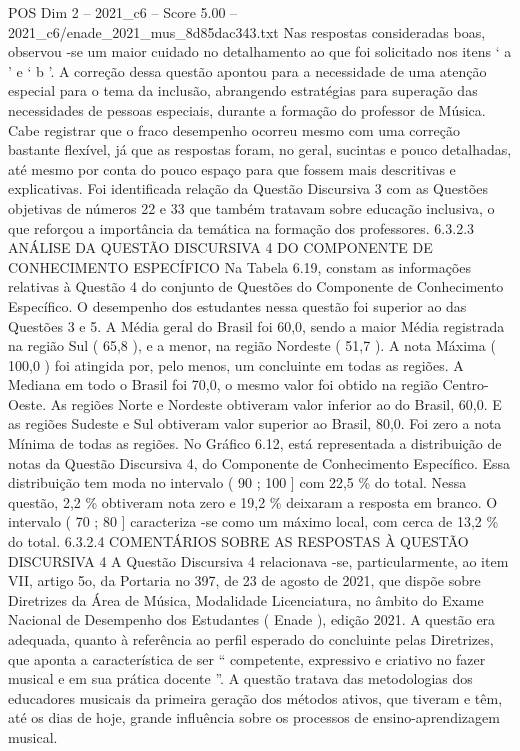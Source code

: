 \begin{textsample}{POS Dim 2 – 2021\_c6 – Score 5.00 – 2021\_c6/enade\_2021\_mus\_8d85dac343.txt}
Nas respostas consideradas boas, observou -se um maior cuidado no detalhamento ao que foi solicitado nos itens ‘ a ’ e ‘ b ’.
A correção dessa questão apontou para a necessidade de uma atenção especial para o tema da inclusão, abrangendo estratégias para superação das necessidades de pessoas especiais, durante a formação do professor de Música.
Cabe registrar que o fraco desempenho ocorreu mesmo com uma correção bastante flexível, já que as respostas foram, no geral, sucintas e pouco detalhadas, até mesmo por conta do pouco espaço para que fossem mais descritivas e explicativas.
Foi identificada relação da Questão Discursiva 3 com as Questões objetivas de números 22 e 33 que também tratavam sobre educação inclusiva, o que reforçou a importância da temática na formação dos professores. 6.3.2.3 ANÁLISE DA QUESTÃO DISCURSIVA 4 DO COMPONENTE DE CONHECIMENTO ESPECÍFICO Na Tabela 6.19, constam as informações relativas à Questão 4 do conjunto de Questões do Componente de Conhecimento Específico.
O desempenho dos estudantes nessa questão foi superior ao das Questões 3 e 5.
A Média geral do Brasil foi 60,0, sendo a maior Média registrada na região Sul ( 65,8 ), e a menor, na região Nordeste ( 51,7 ).
A nota Máxima ( 100,0 ) foi atingida por, pelo menos, um concluinte em todas as regiões.
A Mediana em todo o Brasil foi 70,0, o mesmo valor foi obtido na região Centro-Oeste.
As regiões Norte e Nordeste obtiveram valor inferior ao do Brasil, 60,0.
E as regiões Sudeste e Sul obtiveram valor superior ao Brasil, 80,0.
Foi zero a nota Mínima de todas as regiões.
No Gráfico 6.12, está representada a distribuição de notas da Questão Discursiva 4, do Componente de Conhecimento Específico.
Essa distribuição tem moda no intervalo ( 90 ; 100 ] com 22,5 \% do total.
Nessa questão, 2,2 \% obtiveram nota zero e 19,2 \% deixaram a resposta em branco.
O intervalo ( 70 ; 80 ] caracteriza -se como um máximo local, com cerca de 13,2 \% do total. 6.3.2.4 COMENTÁRIOS SOBRE AS RESPOSTAS À QUESTÃO DISCURSIVA 4 A Questão Discursiva 4 relacionava -se, particularmente, ao item VII, artigo 5o, da Portaria no 397, de 23 de agosto de 2021, que dispõe sobre Diretrizes da Área de Música, Modalidade Licenciatura, no âmbito do Exame Nacional de Desempenho dos Estudantes ( Enade ), edição 2021.
A questão era adequada, quanto à referência ao perfil esperado do concluinte pelas Diretrizes, que aponta a característica de ser “ competente, expressivo e criativo no fazer musical e em sua prática docente ”.
A questão tratava das metodologias dos educadores musicais da primeira geração dos métodos ativos, que tiveram e têm, até os dias de hoje, grande influência sobre os processos de ensino-aprendizagem musical.

\end{textsample}
